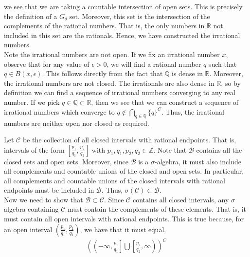\documentclass[12pt]{article}
\newenvironment{problem}[2][Problem]{\begin{trivlist}
\item[\hskip \labelsep {\bfseries #1}\hskip \labelsep {\bfseries #2.}]}{\end{trivlist}}
\begin{document}
we see that we are taking a countable intersection of open sets. This is precisely the definition of a $G_{\delta}$ set. Moreover, this set is the intersection of the complements of the rational numbers. That is, the only numbers in $\mathbb{R}$ not included in this set are the rationals. Hence, we have constructed the irrational numbers.\\

Note the irrational numbers are not open. If we fix an irrational number $x$, observe that for any value of $\epsilon > 0$, we will find a rational number $q$ such that $q \in B(x, \epsilon)$. This follows directly from the fact that $\mathbb{Q}$ is dense in $\mathbb{R}$. Moreover, the irrational numbers are not closed. The irrationals are also dense in $\mathbb{R}$, so by definition we can find a sequence of irrational numbers converging to any real number. If we pick $q \in \mathbb{Q} \subset \mathbb{R}$, then we see that we can construct a sequence of irrational numbers which converge to $q \not\in \bigcap_{q \in \mathbb{Q}} \{q\}^C$. Thus, the irrational numbers are neither open nor closed as required.

\begin{problem}{5}
\end{problem}

Let $\mathcal{C}$ be the collection of all closed intervals with rational endpoints. That is, intervals of the form $\left[ \frac{p_1}{q_1}, \frac{p_2}{q_2} \right]$ with $p_1, q_1, p_2, q_2 \in \mathbb{Z}$. Note that $\mathcal{B}$ contains all the closed sets and open sets. Moreover, since $\mathcal{B}$ is a $\sigma$-algebra, it must also include all complements and countable unions of the closed and open sets. In particular, all complements and countable unions of the closed intervals with rational endpoints must be included in $\mathcal{B}$. Thus, $\sigma(\mathcal{C}) \subset \mathcal{B}$.\\

Now we need to show that $\mathcal{B} \subset \mathcal{C}$. Since $\mathcal{C}$ contains all closed intervals, any $\sigma$ algebra containing $\mathcal{C}$ must contain the complements of these elements. That is, it must contain all open intervals with rational endpoints. This is true because, for an open interval $\left( \frac{p_1}{q_1}, \frac{p_2}{q_2} \right)$, we have that it must equal,
\begin{align*}
\left(\left(-\infty, \frac{p_1}{q_1}\right] \bigcup \left[\frac{p_2}{q_2}, \infty\right)\right)^C
\end{align*}
\end{document}
